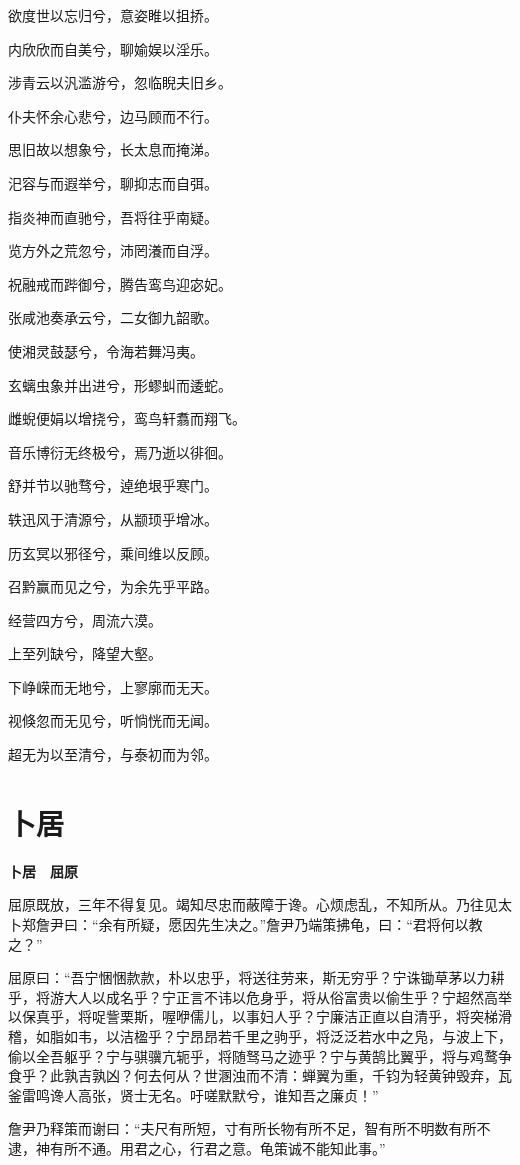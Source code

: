 \documentclass[12pt,a4paper]{ctexbook}
\begin{document}
欲度世以忘归兮，意姿睢以抯挢。\par
内欣欣而自美兮，聊媮娱以淫乐。\par
涉青云以汎滥游兮，忽临睨夫旧乡。\par
仆夫怀余心悲兮，边马顾而不行。\par
思旧故以想象兮，长太息而掩涕。\par
汜容与而遐举兮，聊抑志而自弭。\par
指炎神而直驰兮，吾将往乎南疑。\par
览方外之荒忽兮，沛罔瀁而自浮。\par
祝融戒而跸御兮，腾告鸾鸟迎宓妃。\par
张咸池奏承云兮，二女御九韶歌。\par
使湘灵鼓瑟兮，令海若舞冯夷。\par
玄螭虫象并出进兮，形蟉虯而逶蛇。\par
雌蜺便娟以增挠兮，鸾鸟轩翥而翔飞。\par
音乐博衍无终极兮，焉乃逝以徘徊。\par
舒并节以驰骛兮，逴绝垠乎寒门。\par
轶迅风于清源兮，从颛顼乎增冰。\par
历玄冥以邪径兮，乘间维以反顾。\par
召黔赢而见之兮，为余先乎平路。\par
经营四方兮，周流六漠。\par
上至列缺兮，降望大壑。\par
下峥嵘而无地兮，上寥廓而无天。\par
视倏忽而无见兮，听惝恍而无闻。\par
超无为以至清兮，与泰初而为邻。\par

\section{卜居}
\textbf{卜居　屈原}\par\vspace{0.5em}
屈原既放，三年不得复见。竭知尽忠而蔽障于谗。心烦虑乱，不知所从。乃往见太卜郑詹尹曰：“余有所疑，愿因先生决之。”詹尹乃端策拂龟，曰：“君将何以教之？”\par
屈原曰：“吾宁悃悃款款，朴以忠乎，将送往劳来，斯无穷乎？宁诛锄草茅以力耕乎，将游大人以成名乎？宁正言不讳以危身乎，将从俗富贵以偷生乎？宁超然高举以保真乎，将哫訾栗斯，喔咿儒儿，以事妇人乎？宁廉洁正直以自清乎，将突梯滑稽，如脂如韦，以洁楹乎？宁昂昂若千里之驹乎，将泛泛若水中之凫，与波上下，偷以全吾躯乎？宁与骐骥亢轭乎，将随驽马之迹乎？宁与黄鹄比翼乎，将与鸡鹜争食乎？此孰吉孰凶？何去何从？世溷浊而不清：蝉翼为重，千钧为轻黄钟毁弃，瓦釜雷鸣谗人高张，贤士无名。吁嗟默默兮，谁知吾之廉贞！”\par
詹尹乃释策而谢曰：“夫尺有所短，寸有所长物有所不足，智有所不明数有所不逮，神有所不通。用君之心，行君之意。龟策诚不能知此事。”\par
\end{document}
